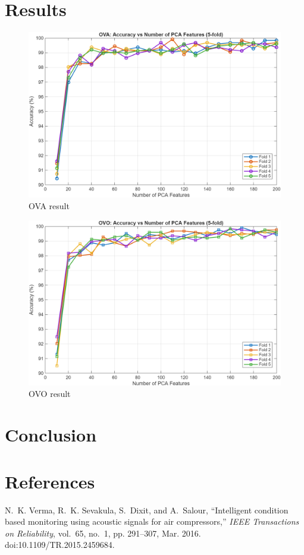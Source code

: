 \documentclass[12pt,a4paper]{article}
\begin{document}
\begin{multicols}{2}
\section{Results}
\begin{figure}[H]
    \centering
    \includegraphics[width=0.85\linewidth]{res1.png}
    \caption{OVA result}
    \label{fig:placeholder}
\end{figure}
\begin{figure}[H]
    \centering
    \includegraphics[width=0.85\linewidth]{res2.png}
    \caption{OVO result}
    \label{fig:placeholder}
\end{figure}
\section{Conclusion}


\section*{References}
\begin{thebibliography}{1}
N.~K. Verma, R.~K. Sevakula, S.~Dixit, and A.~Salour, ``Intelligent condition based monitoring using acoustic signals for air compressors,'' \emph{IEEE Transactions on Reliability}, vol.~65, no.~1, pp. 291--307, Mar. 2016. doi:10.1109/TR.2015.2459684.
\end{thebibliography}
\end{multicols}
\end{document}
